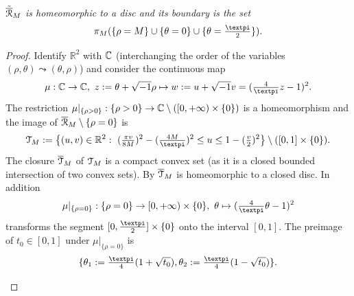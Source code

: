 \documentclass[10pt,twoside]{homg3} %
\newcommand{\proy}{\pi}
\newcommand{\Tt}{{\EuScript T}}
\newcommand{\Rr}{{\EuScript R}}
\renewcommand{\R}{\mathbb{R}}
\begin{document}
\paragraph{}\hspace{-5mm}\label{lem:dos} {\em $\tilde{\overline{\Rr}}_M$ is homeomorphic to a disc and its boundary is the set
$$
\proy_M(\{\rho=M\}\cup\{\theta=0\}\cup\{\theta=\tfrac{\text{\textpi}}{2}\}).
$$}
\noindent\begin{proof}
Identify $\R^2$ with $\mathbb{C}$ (interchanging the order of the variables $(\rho,\theta)\leadsto(\theta,\rho)$) and consider the continuous map 
$$
\mu:\C\to\C,\ z:=\theta+\sqrt{-1}\rho\mapsto w:=u+\sqrt{-1}v=(\tfrac{4}{\text{\textpi}}z-1)^2.
$$
The restriction $\mu|_{\{\rho>0\}}:\{\rho>0\}\to\mathbb{C}\setminus([0,+\infty)\times\{0\})$ is a homeomorphism and the image of $\overline{\Rr}_M\setminus\{\rho=0\}$ is
$$
\Tt_M:=\big\{(u,v)\in\R^2:\ (\tfrac{\pi v}{8M})^2-(\tfrac{4M}{\text{\textpi}})^2\leq u\leq1-(\tfrac{v}{2})^2\big\}\setminus([0,1]\times\{0\}).
$$
The closure $\overline{\Tt}_M$ of $\Tt_M$ is a compact convex set (as it is a closed bounded intersection of two convex sets). By \cite[Cor.11.3.4]{ber1} $\overline{\Tt}_M$ is homeomorphic to a closed disc. In addition
$$
\mu|_{\{\rho=0\}}:\{\rho=0\}\to[0,+\infty)\times\{0\},\ \theta\mapsto(\tfrac{4}{\text{\textpi}}\theta-1)^2
$$
transforms the segment $[0,\tfrac{\text{\textpi}}{2}]\times\{0\}$ onto the interval $[0,1]$. The preimage of $t_0\in[0,1]$ under $\mu|_{\{\rho=0\}}$ is 
$$
\{\theta_1:=\tfrac{\text{\textpi}}{4}(1+\sqrt{t_0}),\theta_2:=\tfrac{\text{\textpi}}{4}(1-\sqrt{t_0})\}.
$$


\begin{figure}[!ht]
\begin{center}
\end{center}
\end{figure}
\end{proof}
\end{document}
